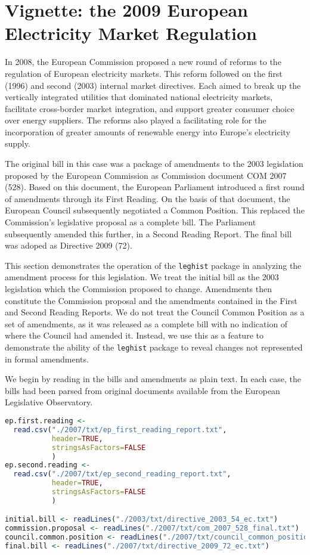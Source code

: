 \documentclass[11pt]{article}
\begin{document}
\section{Vignette: the 2009 European Electricity Market Regulation }
\label{sec:vign-2009-europ}

In 2008, the European Commission proposed a new round of reforms to
the regulation of European electricity markets. This reform followed
on the first (1996) and second (2003) internal market directives. Each
aimed to break up the vertically integrated utilities that dominated
national electricity markets, facilitate cross-border market
integration, and support greater consumer choice over energy
suppliers. The reforms also played a facilitating role for the
incorporation of greater amounts of renewable energy into Europe's
electricity supply. 

The original bill in this case was a package of amendments to the 2003
legislation proposed by the European Commission as Commission document
COM 2007 (528). Based on this document, the European Parliament
introduced a first round of amendments through its First Reading. On
the basis of that document, the European Council subsequently
negotiated a Common Position. This replaced the Commission's
legislative proposal as a complete bill. The Parliament subsequently
amended this further, in a Second Reading Report. The final bill was
adoped as Directive 2009 (72). 

This section demonstrates the operation of the \texttt{leghist}
package in analyzing the amendment process for this legislation. We
treat the initial bill as the 2003 legislation which the Commission
proposed to change. Amendments then constitute the Commission proposal
and the amendments contained in the First and Second Reading
Reports. We do not treat the Council Common Position as a set of
amendments, as it was released as a complete bill with no indication
of where the Council had amended it. Instead, we use this as a feature
to demonstrate the ability of the \texttt{leghist} package to reveal
changes not represented in formal amendments. 

We begin by reading in the bills and amendments as plain text. In each
case, the bills had been parsed from original documents available from
the European Legislative Observatory. 

\begin{lstlisting}[language=R, numbers=none]
ep.first.reading <- 
  read.csv("./2007/txt/ep_first_reading_report.txt",
           header=TRUE,
           stringsAsFactors=FALSE
           )
ep.second.reading <-
  read.csv("./2007/txt/ep_second_reading_report.txt",
           header=TRUE,
           stringsAsFactors=FALSE
           )

initial.bill <- readLines("./2003/txt/directive_2003_54_ec.txt")
commission.proposal <- readLines("./2007/txt/com_2007_528_final.txt")
council.common.position <- readLines("./2007/txt/council_common_position.txt")
final.bill <- readLines("./2007/txt/directive_2009_72_ec.txt")
\end{lstlisting}
\end{document}
